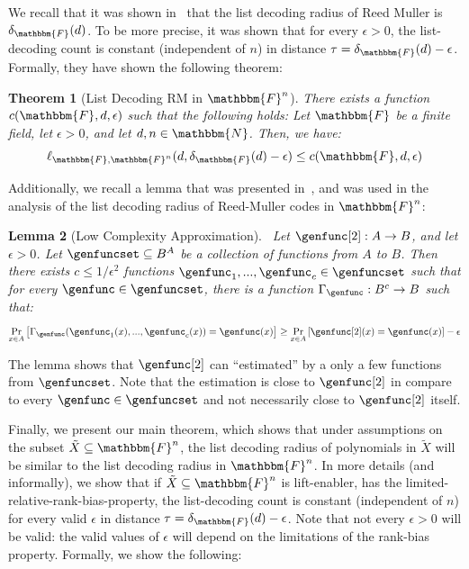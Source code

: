 \documentclass[10pt,a4paper]{article}
\newtheorem{theorem}{Theorem}[section]
\newtheorem{lemma}[theorem]{Lemma}
\newcommand{\basefield}[0]{\mathbbm{F}}
\newcommand{\blocklength}[0]{n}
\newcommand{\field}[0]{\basefield^{\blocklength}}
\newcommand{\degree}[0]{d}
\newcommand{\funcdef}[3]{#1:#2\rightarrow#3}
\newcommand{\naturalnumbersset}[0]{\mathbbm{N}}
\newcommand{\variety}{{\tilde{X}}}
\newcommand{\prex}[2]{\Pr_{#1}\left[ #2 \right]}
\newcommand{\listpolycount}[4]{\ell_{#1, #2}(#3, #4)}
\newcommand{\normalizedcodedistance}[2]{\delta_{#1}(#2)}
\begin{document}
We recall that it was shown in~\cite[Theorem 1]{bhowmick2014list} that the list decoding radius of Reed Muller is $\normalizedcodedistance{\basefield}{\degree}$.
To be more precise, it was shown that for every $\epsilon > 0$, the list-decoding count is constant (independent of $\blocklength$) in distance $\tau = \normalizedcodedistance{\basefield}{\degree} - \epsilon$.
Formally, they have shown the following theorem:
\begin{theorem}[List Decoding RM in $\field$]\label{list-decoding-RM-in-Fn}
    There exists a function $c(\basefield, \degree, \epsilon)$ such that the following holds:
    Let $\basefield$ be a finite field, let $\epsilon > 0$, and let $\degree, \blocklength \in \naturalnumbersset$.
    Then, we have:
    \[
        \listpolycount{\basefield}{\field}{\degree}{\normalizedcodedistance{\basefield}{\degree} - \epsilon}
        \leq c(\basefield, \degree, \epsilon)
    \]
\end{theorem}
Additionally, we recall a lemma that was presented in~\cite[Corollary 3.3]{bhowmick2014list}, and was used in the analysis of the list decoding radius of Reed-Muller codes in $\field$:
\begin{lemma}[Low Complexity Approximation]~\cite[Corollary 3.3]{bhowmick2014list}\label{every-function-can-be-approximated-by-a-few-functions}
Let $\funcdef{\genfunc[2]}{A}{B}$, and let $\epsilon > 0$.
Let $\genfuncset \subseteq B^A$ be a collection of functions from $A$ to $B$.
Then there exists $c \leq 1/\epsilon^2$ functions $\genfunc_1,...,\genfunc_c \in \genfuncset$ such that
for every $\genfunc \in \genfuncset$, there is a function $\funcdef{\Gamma_{\genfunc}}{B^c}{B}$ such that:
\[
    \prex{x \in A}{\Gamma_{\genfunc}(\genfunc_1(x),...,\genfunc_c(x)) = \genfunc(x)}
    \geq \prex{x \in A}{\genfunc[2](x) = \genfunc(x)} - \epsilon
\]
\end{lemma}
The lemma shows that $\genfunc[2]$ can ``estimated'' by a only a few functions from $\genfuncset$.
Note that the estimation is close to $\genfunc[2]$ in compare to every $\genfunc \in \genfuncset$ and not necessarily close to $\genfunc[2]$ itself.

Finally, we present our main theorem, which shows that under assumptions on the subset $\variety \subseteq \field$, the list decoding radius of polynomials in $\variety$ will be similar to the list decoding radius in $\field$.
\newline
In more details (and informally), we show that if $\variety \subseteq \field$ is lift-enabler, has the limited-relative-rank-bias-property,
the list-decoding count is constant (independent of $\blocklength$) for every valid $\epsilon$ in distance $\tau = \normalizedcodedistance{\basefield}{\degree} - \epsilon$.
Note that not every $\epsilon > 0$ will be valid: the valid values of $\epsilon$ will depend on the limitations of the rank-bias property.
Formally, we show the following:
\end{document}
